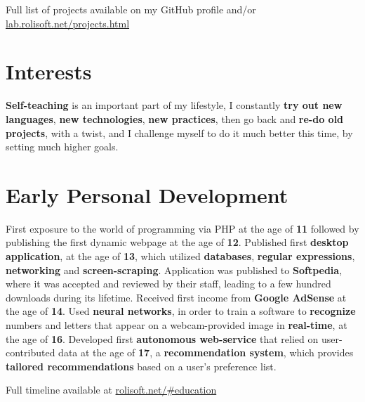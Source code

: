 \documentclass[11pt,a4paper,sans]{moderncv}
\renewcommand*{\httplink}[2][]{%
	\ifthenelse{\equal{#1}{}}%
	{\href{https://#2}{#2}}%
	{\href{https://#2}{#1}}}
\begin{document}
	\vspace{6pt}

	Full list of projects available on my GitHub profile and/or \httplink{lab.rolisoft.net/projects.html}

\section{Interests}

	\textbf{Self-teaching} is an important part of my lifestyle, I constantly \textbf{try out new languages}, \textbf{new technologies}, \textbf{new practices}, then go back and \textbf{re-do old projects}, with a twist, and I challenge myself to do it much better this time, by setting much higher goals.

\section{Early Personal Development}

	First exposure to the world of programming via PHP at the age of \textbf{11} followed by publishing the first dynamic webpage at the age of \textbf{12}. Published first \textbf{desktop application}, at the age of \textbf{13}, which utilized \textbf{databases}, \textbf{regular expressions}, \textbf{networking} and \textbf{screen-scraping}. Application was published to \textbf{Softpedia}, where it was accepted and reviewed by their staff, leading to a few hundred downloads during its lifetime. Received first income from \textbf{Google AdSense} at the age of \textbf{14}. Used \textbf{neural networks}, in order to train a software to \textbf{recognize} numbers and letters that appear on a webcam-provided image in \textbf{real-time}, at the age of \textbf{16}. Developed first \textbf{autonomous web-service} that relied on user-contributed data at the age of \textbf{17}, a \textbf{recommendation system}, which provides \textbf{tailored recommendations} based on a user's preference list.

	\vspace{6pt}

	Full timeline available at \httplink{rolisoft.net/\#education}
\end{document}
